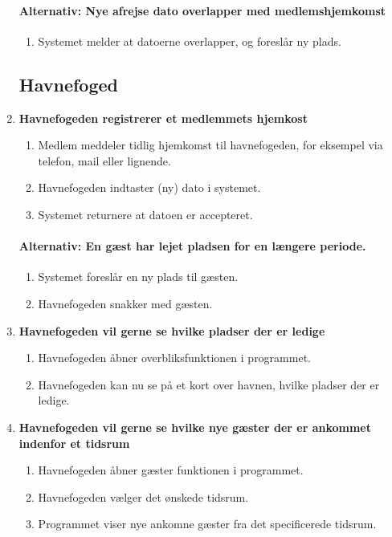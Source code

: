 \begin{enumerate}
    \paragraph{Alternativ: Nye afrejse dato overlapper med medlemshjemkomst}
      \begin{enumerate}
        \item Systemet melder at datoerne overlapper, og foreslår ny plads.
      \end{enumerate}

\subsection{Havnefoged}
    \item{\bf{Havnefogeden registrerer et medlemmets hjemkost}}
      \begin{enumerate}
        \item Medlem meddeler tidlig hjemkomst til havnefogeden, for eksempel via telefon, mail eller lignende.
        \item Havnefogeden indtaster (ny) dato i systemet.
        \item Systemet returnere at datoen er accepteret.
      \end{enumerate}
  
    \paragraph{Alternativ: En gæst har lejet pladsen for en længere periode.}
      \begin{enumerate}
        \item Systemet foreslår en ny plads til gæsten.
        \item Havnefogeden snakker med gæsten.
      \end{enumerate}

    \item{\bf{Havnefogeden vil gerne se hvilke pladser der er ledige}}
      \begin{enumerate}
        \item Havnefogeden åbner overbliksfunktionen i programmet.
        \item Havnefogeden kan nu se på et kort over havnen, hvilke pladser der er ledige.
      \end{enumerate}

    \item{\bf{Havnefogeden vil gerne se hvilke nye gæster der er ankommet indenfor et tidsrum}}
      \begin{enumerate}
        \item Havnefogeden åbner gæster funktionen i programmet.
        \item Havnefogeden vælger det ønskede tidsrum.
        \item Programmet viser nye ankomne gæster fra det specificerede tidsrum.
      \end{enumerate}


\end{enumerate}
